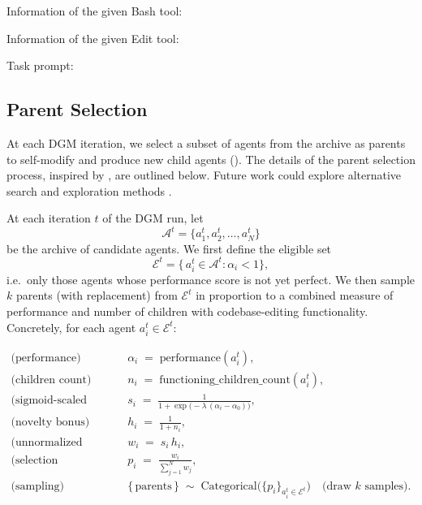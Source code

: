 \documentclass{article} %
\begin{document}
Information of the given Bash tool:


Information of the given Edit tool:


Task prompt:


\subsection{Parent Selection}
\label{app:parent-select}

At each DGM iteration, we select a subset of agents from the archive as parents to self-modify and produce new child agents (). The details of the parent selection process, inspired by \citet{ecoffet2019go}, are outlined below. Future work could explore alternative search and exploration methods \citep{coulom2006efficient, silver2016mastering, herr2025llm}.

At each iteration \(t\) of the DGM run, let
\[
\mathcal{A}^t = \{a_1^t, a_2^t, \dots, a_N^t\}
\]
be the archive of candidate agents.  We first define the eligible set
\[
\mathcal{E}^t = \bigl\{\,a_i^t \in \mathcal{A}^t : \alpha_i < 1 \bigr\},
\]
i.e.\ only those agents whose performance score is not yet perfect. We then sample \(k\) parents (with replacement) from \(\mathcal{E}^t\) in proportion to a combined measure of performance and number of children with codebase-editing functionality. Concretely, for each agent \(a_i^t \in \mathcal{E}^t\):

\begin{align}
\text{(performance)}\quad & \alpha_i \;=\; \mathrm{performance}(a_i^t), 
\\
\text{(children count)}\quad & n_i \;=\; \mathrm{functioning\_children\_count}(a_i^t),
\\[6pt]
\text{(sigmoid‐scaled performance)}\quad 
& s_i \;=\; \frac{1}{1 + \exp\!\bigl(-\lambda\,(\alpha_i - \alpha_0)\bigr)},
\\[4pt]
\text{(novelty bonus)}\quad 
& h_i \;=\; \frac{1}{1 + n_i},
\\[4pt]
\text{(unnormalized weight)}\quad 
& w_i \;=\; s_i\,h_i,
\\[4pt]
\text{(selection probability)}\quad 
& p_i \;=\; \frac{w_i}{\sum_{j=1}^{N} w_j},
\\[8pt]
\text{(sampling)}\quad 
& \{\,\text{parents}\,\} \;\sim\; \mathrm{Categorical}\bigl(\{p_i\}_{a_i^t \in \mathcal{E}^t}\bigr)\quad\text{(draw \(k\) samples).}
\end{align}
\end{document}

